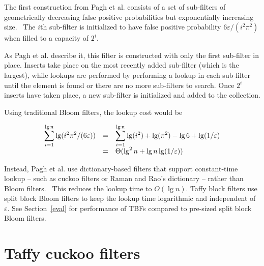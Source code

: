 \documentclass[sigconf]{acmart}
\newcommand{\etal}{et al.}
\begin{document}
The first construction from Pagh \etal{} consists of a set of sub-filters of geometrically decreasing false positive probabilities but exponentially increasing size.~\cite{psw}
The $i$th sub-filter is initialized to have false positive probability $6 \varepsilon/(i^2 \pi^2)$ when filled to a capacity of $2^i$.

As Pagh \etal{} describe it, this filter is constructed with only the first sub-filter in place.
Inserts take place on the most recently added sub-filter (which is the largest), while lookups are performed by performing a lookup in each sub-filter until the element is found or there are no more sub-filters to search.
Once $2^i$ inserts have taken place, a new sub-filter is initialized and added to the collection.

Using traditional Bloom filters, the lookup cost would be

\[
\begin{array}{r c l}
\displaystyle\sum_{i=1}^{\lg n} \lg (i^2 \pi^2 /(6 \varepsilon)) & = &
 \displaystyle\sum_{i=1}^{\lg n} \lg (i^2) + \lg( \pi^2) - \lg 6 + \lg (1/\varepsilon) \\
& = & \Theta(\lg^2 n + \lg n \lg (1/\varepsilon))
\end{array}
\]

Instead, Pagh \etal{} use dictionary-based filters that support constant-time lookup -- such as cuckoo filters or Raman and Rao's dictionary -- rather than Bloom filters.~\cite{succinct,psw}
This reduces the lookup time to $O(\lg n)$.
Taffy block filters use split block Bloom filters to keep the lookup time logarithmic and independent of $\varepsilon$.
See Section~\ref{eval} for performance of TBFs compared to pre-sized split block Bloom filters.


\section{Taffy cuckoo filters}
\label{tcf}

\end{document}
